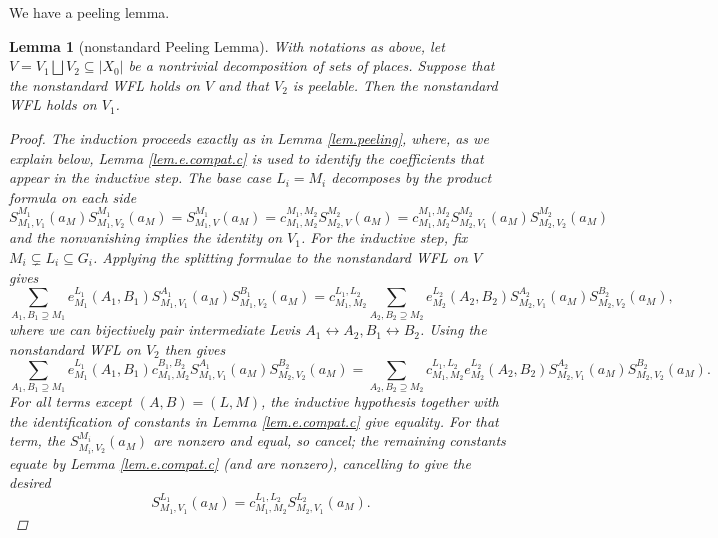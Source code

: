 \documentclass[openany]{amsbook}
\newtheorem{lemma}[theorem]{Lemma}
\theoremstyle{definition}
\theoremstyle{remark}
\numberwithin{equation}{section}
\renewcommand{\-}{\operatorname{-}}
\begin{document}
We have a peeling lemma.
\begin{lemma}[nonstandard Peeling Lemma]\label{lem.peeling.nonstd}
    With notations as above, let $V = V_1 \bigsqcup V_2 \subseteq |X_0|$ be a nontrivial decomposition of sets of places. Suppose that the nonstandard WFL holds on $V$ and that $V_2$ is peelable. Then the nonstandard WFL holds on $V_1$.
    \begin{proof}
        The induction proceeds exactly as in Lemma \ref{lem.peeling}, where, as we explain below, Lemma \ref{lem.e.compat.c} is used to identify the coefficients that appear in the inductive step. The base case $L_i = M_i$ decomposes by the product formula on each side
        $$
            S_{M_1,V_1}^{M_1}(a_M) S_{M_1,V_2}^{M_1}(a_M) = S_{M_1,V}^{M_1}(a_M) = c_{M_1, M_2}^{M_1, M_2} S_{M_2,V}^{M_2}(a_M) = c_{M_1, M_2}^{M_1, M_2}S_{M_2,V_1}^{M_2}(a_M)S_{M_2,V_2}^{M_2}(a_M)
        $$
        and the nonvanishing implies the identity on $V_1$. For the inductive step, fix $M_i \subsetneq L_i \subseteq G_i$. Applying the splitting formulae to the nonstandard WFL on $V$ gives
        $$
            \sum_{A_1,B_1 \supseteq M_1} e_{M_1}^{L_1}(A_1, B_1) S_{M_1, V_1}^{A_1}(a_M) S_{M_1, V_2}^{B_1}(a_M) = c_{M_1, M_2}^{L_1, L_2} \sum_{A_2, B_2 \supseteq M_2} e_{M_2}^{L_2}(A_2, B_2) S_{M_2, V_1}^{A_2}(a_M) S_{M_2, V_2}^{B_2}(a_M),
        $$
        where we can bijectively pair intermediate Levis $A_1 \longleftrightarrow A_2, B_1 \longleftrightarrow B_2$. Using the nonstandard WFL on $V_2$ then gives
        $$
            \sum_{A_1,B_1 \supseteq M_1} e_{M_1}^{L_1}(A_1, B_1) c_{M_1, M_2}^{B_1, B_2} S_{M_1, V_1}^{A_1}(a_M) S_{M_2, V_2}^{B_2}(a_M) = \sum_{A_2, B_2 \supseteq M_2} c_{M_1, M_2}^{L_1, L_2} e_{M_2}^{L_2}(A_2, B_2) S_{M_2, V_1}^{A_2}(a_M) S_{M_2, V_2}^{B_2}(a_M).
        $$
        For all terms except $(A,B) = (L,M)$, the inductive hypothesis together with the identification of constants in Lemma \ref{lem.e.compat.c} give equality. For that term, the $S_{M_i, V_2}^{M_i}(a_M)$ are nonzero and equal, so cancel; the remaining constants equate by Lemma \ref{lem.e.compat.c} (and are nonzero), cancelling to give the desired
        $$
            S_{M_1, V_1}^{L_1}(a_M) = c_{M_1, M_2}^{L_1, L_2} S_{M_2, V_1}^{L_2}(a_M).
        $$
    \end{proof}
\end{lemma}
\end{document}
